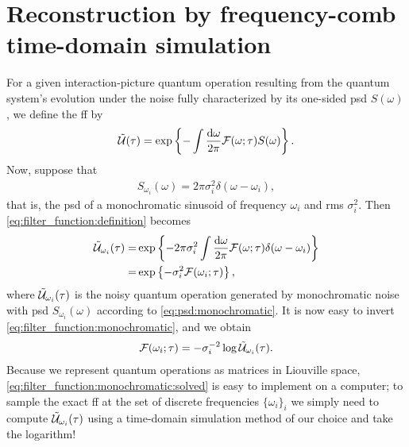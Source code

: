 \chapter{Reconstruction by frequency-comb time-domain simulation}\label{ch:filter_functions:validation}
For a {\color{RWTHmagenta75} given} interaction-picture quantum operation \liouvUe resulting from the quantum system's evolution under the noise fully characterized by its one-sided \gls{psd} $S(\omega)$, we define the \gls{ff} \FF by
\begin{align}
    \label{eq:filter_function:definition}
    \mathcal{\tilde{U}}(\tau) = \exp\left\{-\int\frac{\dd{\omega}}{2\pi}\mathcal{F}(\omega;\tau) S(\omega)\right\}.
\end{align}
Now, suppose that
\begin{align}
    \label{eq:psd:monochromatic}
    S_{\omega_i}(\omega) = 2\pi\sigma_i^2 \delta(\omega - \omega_i), %
\end{align}
that is, the \gls{psd} of a monochromatic sinusoid of frequency $\omega_i$ and \gls{rms} $\sigma_i^2$.
Then \cref{eq:filter_function:definition} becomes
\begin{equation}
    \label{eq:filter_function:monochromatic}
    \begin{split}
        \mathcal{\tilde{U}}_{\omega_i}(\tau) =& \exp\left\lbrace -2\pi\sigma_i^2\int\frac{\dd{\omega}}{2\pi}\mathcal{F}(\omega;\tau)\delta(\omega - \omega_i)\right\rbrace \\
                                  =& \exp\left\lbrace -\sigma_i^2\mathcal{F}(\omega_i;\tau)\right\rbrace,
    \end{split}
\end{equation}
where $\mathcal{\tilde{U}}_{\omega_i}(\tau)$ is the noisy quantum operation generated by monochromatic noise with \gls{psd} $S_{\omega_i}(\omega)$ according to \cref{eq:psd:monochromatic}.
It is now easy to invert \cref{eq:filter_function:monochromatic}, and we obtain
\begin{align}
    \label{eq:filter_function:monochromatic:solved}
    \mathcal{F}(\omega_i; \tau) = -\sigma_i^{-2}\log\mathcal{\tilde{U}}_{\omega_i}(\tau).
\end{align}
Because we represent quantum operations as matrices in Liouville space, \cref{eq:filter_function:monochromatic:solved} is easy to implement on a computer; to sample the exact \gls{ff} at the set of discrete frequencies $\lbrace\omega_i\rbrace_i$ we simply need to compute $\mathcal{\tilde{U}}_{\omega_i}(\tau)$  using a time-domain simulation method of our choice and take the logarithm!

